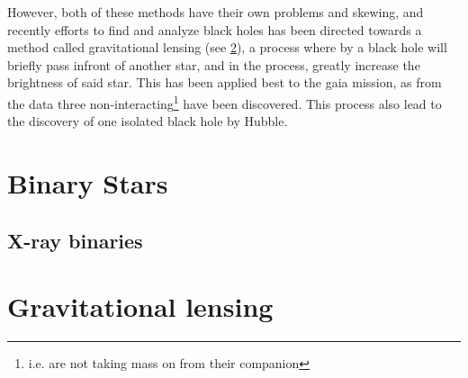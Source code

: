 \documentclass[amsmath,twocolumn]{aastex702}
\begin{document}
However, both of these methods have their own problems and skewing, and recently efforts to find and analyze black holes has been directed towards a method called gravitational lensing (see \ref{sec:grav-lensing}), 
a process where by a black hole will briefly pass infront of another star, and in the process, greatly increase the brightness of said star. 
This has been applied best to the gaia mission, as from the data three non-interacting\footnote{i.e. are not taking mass on from their companion} have been discovered.
This process also lead to the discovery of one isolated black hole by Hubble.

\pagebreak

\printnoidxglossary[title={Glossary},sort=word]

\appendix

\section{Binary Stars} \label{sec:binary-stars}
\subsection{X-ray binaries} \label{sec:XrBs}
\section{Gravitational lensing} \label{sec:grav-lensing}


{}

\end{document}
